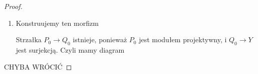 \begin{proof}
  \begin{enumerate}[label=(\alph*)]
    \item Konstruujemy ten morfizm 
      \begin{center}\end{center}
      Strzałka $P_0\to Q_0$ istnieje, ponieważ $P_0$ jest modułem projektywny, i $Q_0\to Y$ jest surjekcją. Czyli mamy diagram
      \begin{center}\end{center}
  \end{enumerate}

  {\large\color{red}CHYBA WRÓCIĆ}
\end{proof}
